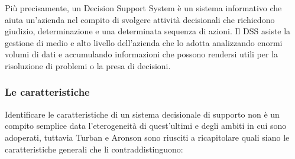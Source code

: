 Più precisamente, un Decision Support System è un sistema informativo che aiuta un'azienda nel compito di svolgere attività decisionali che richiedono giudizio, determinazione e una determinata sequenza di azioni. Il DSS asiste la gestione di medio e alto livello dell'azienda che lo adotta analizzando enormi volumi di dati e accumulando informazioni che possono rendersi utili per la risoluzione di problemi o la presa di decisioni.\cite{cfi_dss}

\subsubsection{Le caratteristiche}

Identificare le caratteristiche di un sistema decisionale di supporto non è un compito semplice data l'eterogeneità di quest'ultimi e degli ambiti in cui sono adoperati, tuttavia Turban e Aronson sono riusciti a ricapitolare quali siano le caratteristiche generali che li contraddistinguono:\cite{dss_characteristics}

